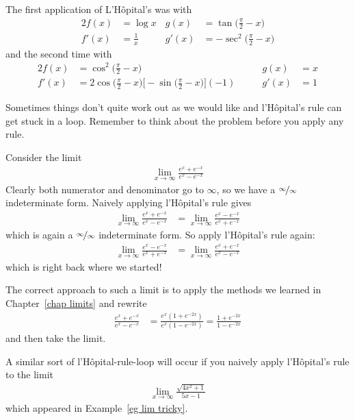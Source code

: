 \begin{enumerate}[(a)]
\begin{eg}
The first application of L'H\^opital's was with
\begin{alignat*}{2}
  f(x) &= \log x &
  g(x) &=\tan\Big(\frac{\pi}{2}-x\Big)   \\
  f'(x)&=\frac{1}{x}\qquad&
  g'(x)&=-\sec^2\Big(\frac{\pi}{2}-x\Big)
\end{alignat*}
and the second time with
\begin{alignat*}{2}
  f(x) &= \cos^2\Big(\frac{\pi}{2}-x\Big) &
  g(x) &=x   \\[0.1in]
  f'(x)&=2\cos\Big(\frac{\pi}{2}-x\Big)
          \Big[-\sin\Big(\frac{\pi}{2}-x\Big)\Big](-1)\qquad&
  g'(x)&=1
\end{alignat*}
\end{eg}

Sometimes things don't quite work out as we would like and l'H\^opital's rule can get
stuck in a loop. Remember to think about the problem before you apply any rule.
\begin{eg}\label{eg_3_7_4}
 Consider the limit
\begin{align*}
  \lim_{x\to\infty} \frac{ e^x + e^{-x} }{e^x - e^{-x}}
\end{align*}
Clearly both numerator and denominator go to $\infty$, so we have a
$\nicefrac\infty\infty$ indeterminate form. Naively applying l'H\^opital's rule gives
\begin{align*}
  \lim_{x\to\infty} \frac{ e^x + e^{-x} }{e^x - e^{-x}}
  &= \lim_{x\to\infty} \frac{ e^x - e^{-x} }{e^x + e^{-x}}
\end{align*}
which is again a $\nicefrac\infty\infty$ indeterminate form. So apply l'H\^opital's rule
again:
\begin{align*}
\lim_{x\to\infty} \frac{ e^x - e^{-x} }{e^x + e^{-x}}
  &= \lim_{x\to\infty} \frac{ e^x + e^{-x} }{e^x - e^{-x}}
\end{align*}
which is right back where we started!

The correct approach to such a limit is to apply the methods we learned in
Chapter~\ref{chap limits} and rewrite
\begin{align*}
  \frac{e^x+e^{-x}}{e^x-e^{-x}} &= \frac{e^x(1+e^{-2x})}{e^x(1-e^{-2x})}
  = \frac{1+e^{-2x}}{1-e^{-2x}}
\end{align*}
and then take the limit.

A similar sort of l'H\^opital-rule-loop will occur if you naively apply
l'H\^opital's rule to the limit
\begin{align*}
  \lim_{x\to\infty} \frac{\sqrt{4x^2+1}}{5x-1}
\end{align*}
which appeared in Example~\ref{eg lim tricky}.
\end{eg}


\end{enumerate}
